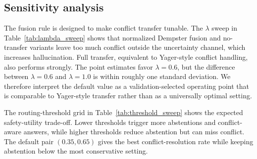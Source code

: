 \documentclass[preprint,12pt,authoryear,nopreprintline]{elsarticle}
\begin{document}
\subsection{Sensitivity analysis}

The fusion rule is designed to make conflict transfer tunable. The $\lambda$ sweep in Table~\ref{tab:lambda_sweep} shows that normalized Dempster fusion and no-transfer variants leave too much conflict outside the uncertainty channel, which increases hallucination. Full transfer, equivalent to Yager-style conflict handling, also performs strongly. The point estimates favor $\lambda=0.6$, but the difference between $\lambda=0.6$ and $\lambda=1.0$ is within roughly one standard deviation. We therefore interpret the default value as a validation-selected operating point that is comparable to Yager-style transfer rather than as a universally optimal setting.

\begin{table}[H]
\centering
\caption{Effect of evidence-combination rule and conflict-transfer strength on CRAG ambiguous performance. Values are mean $\pm$ standard deviation over three seeds.}
\label{tab:lambda_sweep}
\scriptsize
{}
\end{table}

The routing-threshold grid in Table~\ref{tab:threshold_sweep} shows the expected safety-utility trade-off. Lower thresholds trigger more abstentions and conflict-aware answers, while higher thresholds reduce abstention but can miss conflict. The default pair $(0.35,0.65)$ gives the best conflict-resolution rate while keeping abstention below the most conservative setting.
\end{document}
